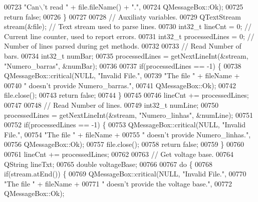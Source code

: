 \begin{DoxyCode}
00723                           \textcolor{stringliteral}{"Can\(\backslash\)'t read "} + file.fileName() + \textcolor{stringliteral}{"."},
00724                           QMessageBox::Ok);
00725     \textcolor{keywordflow}{return} \textcolor{keyword}{false};
00726   \}
00727 
00728   \textcolor{comment}{// Auxiliaty variables.}
00729   QTextStream stream(&file); \textcolor{comment}{// Text stream used to parse lines.}
00730   int32\_t lineCnt = 0; \textcolor{comment}{// Current line counter, used to report errors.}
00731   int32\_t processedLines = 0; \textcolor{comment}{// Number of lines parsed during get methods.}
00732 
00733   \textcolor{comment}{// Read Number of bars.}
00734   int32\_t numBar;
00735   processedLines = getNextLineInt(&stream, \textcolor{stringliteral}{"Numero\_barras"}, &numBar);
00736 
00737   \textcolor{keywordflow}{if}(processedLines == -1) \{
00738     QMessageBox::critical(NULL, \textcolor{stringliteral}{"Invalid File."},
00739                           \textcolor{stringliteral}{"The file "} + fileName +
00740                           \textcolor{stringliteral}{" doesn't provide Numero\_barras."},
00741                           QMessageBox::Ok);
00742     file.close();
00743     \textcolor{keywordflow}{return} \textcolor{keyword}{false};
00744   \}
00745 
00746   lineCnt += processedLines;
00747 
00748   \textcolor{comment}{// Read Number of lines.}
00749   int32\_t numLine;
00750   processedLines = getNextLineInt(&stream, \textcolor{stringliteral}{"Numero\_linhas"}, &numLine);
00751 
00752   \textcolor{keywordflow}{if}(processedLines == -1) \{
00753     QMessageBox::critical(NULL, \textcolor{stringliteral}{"Invalid File."},
00754                           \textcolor{stringliteral}{"The file "} + fileName +
00755                           \textcolor{stringliteral}{" doesn't provide Numero\_linhas."},
00756                           QMessageBox::Ok);
00757     file.close();
00758     \textcolor{keywordflow}{return} \textcolor{keyword}{false};
00759   \}
00760 
00761   lineCnt += processedLines;
00762 
00763   \textcolor{comment}{// Get voltage base.}
00764   QString lineTxt;
00765   \textcolor{keywordtype}{double} voltageBase;
00766 
00767   \textcolor{keywordflow}{do} \{
00768     \textcolor{keywordflow}{if}(stream.atEnd()) \{
00769       QMessageBox::critical(NULL, \textcolor{stringliteral}{"Invalid File."},
00770                             \textcolor{stringliteral}{"The file "} + fileName +
00771                             \textcolor{stringliteral}{" doesn't provide the voltage base."},
00772                             QMessageBox::Ok);

\end{DoxyCode}
